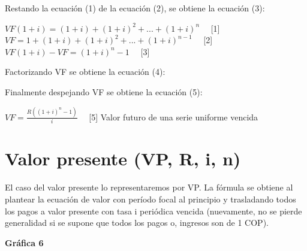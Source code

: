         Restando la ecuación (1) de la ecuación (2), se obtiene la ecuación (3):\\

        \begin{center}
    $VF(1+i)= (1+i)+(1+i)^{2}+...+(1+i)^{n}$ \ \ [1]
    	\\
    $VF=1+(1+i)+(1+i)^{2}+...+(1+i)^{n-1}$ \ \ [2]\\
    $VF (1+i) - VF = (1+i)^{n} -1$ \ \ [3]\\
        \end{center}

	Factorizando VF se obtiene la ecuación (4):\\
        \begin{center}
         \end{center}
	Finalmente despejando VF se obtiene la ecuación (5):\\
        \begin{center}

$VF = \frac {R((1+i)^n-1)}{i}$ \ \ [5] \hspace{35pt} {Valor futuro de una serie uniforme vencida} \\
          \end{center}

	\section{Valor presente (VP, R, i, n)}

	El caso del valor presente lo representaremos por VP. La fórmula se obtiene al plantear la ecuación de valor con período focal al principio y trasladando todos los pagos a valor presente con tasa i periódica vencida (nuevamente, no se pierde generalidad si se supone que todos los pagos o, ingresos son de 1 COP).

	\vspace{5mm}
         \textbf{Gráfica 6}
          \\\\
      
